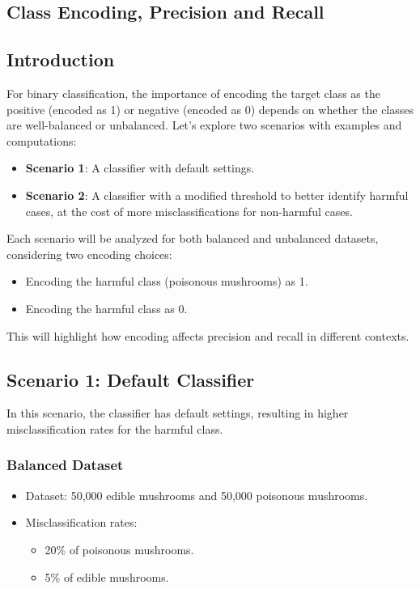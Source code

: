 \begin{notechapter}
\chapter{Class Encoding, Precision and Recall}\label{ch:precision-recall}

\section{Introduction}
For binary classification, the importance of encoding the target class
as the positive (encoded as 1) or negative (encoded as 0)
depends on whether the classes are 
well-balanced or unbalanced. Let's explore two scenarios with 
examples and computations:
\begin{itemize}
    \item \textbf{Scenario 1}: A classifier with default settings.
    \item \textbf{Scenario 2}: A classifier with a modified threshold 
    to better identify harmful cases, at the cost of more 
    misclassifications for non-harmful cases.
\end{itemize}

Each scenario will be analyzed for both balanced and unbalanced 
datasets, considering two encoding choices:
\begin{itemize}
    \item Encoding the harmful class (poisonous mushrooms) as 1.
    \item Encoding the harmful class as 0.
\end{itemize}

This will highlight how encoding affects precision and recall in 
different contexts.

\section{Scenario 1: Default Classifier}
In this scenario, the classifier has default settings, resulting 
in higher misclassification rates for the harmful class.

\subsection{Balanced Dataset}
\begin{itemize}
    \item Dataset: 50,000 edible mushrooms and 50,000 poisonous 
    mushrooms.
    \item Misclassification rates:
        \begin{itemize}
            \item 20\% of poisonous mushrooms.
            \item 5\% of edible mushrooms.
        \end{itemize}
\end{itemize}


\end{notechapter}
